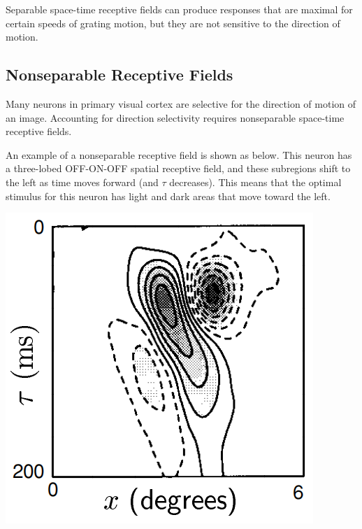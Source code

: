 \begin{rem}
   Separable space-time receptive fields can produce responses that are maximal for certain speeds of grating motion, but they are not sensitive to the direction of motion.
 \end{rem}

 \subsection{Nonseparable Receptive Fields}
\label{sec:NonseparableReceptiveFields}

\begin{rem}
  Many neurons in primary visual cortex are selective for the direction of motion of an image. Accounting for direction selectivity requires nonseparable space-time receptive fields.
\end{rem}

\begin{exm}
  \label{exm:nonseparableReceptiveFieldExm}
  An example of a nonseparable receptive field is shown as below. This neuron has a three-lobed OFF-ON-OFF spatial receptive field, and these subregions shift to the left as time moves forward (and $\tau$ decreases). This means that the optimal stimulus for this neuron has light and dark areas that move toward the left.
  \begin{center}
    \includegraphics[scale=0.3]{./png/nonseparableReceptiveFieldExm}
  \end{center}
\end{exm}

